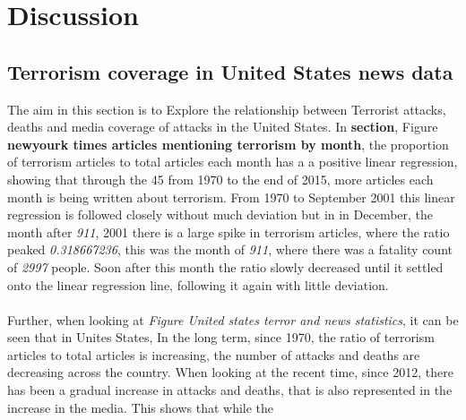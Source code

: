 \documentclass[10pt,a4paper]{article}
\begin{document}
\section{Discussion} 

\subsection{Terrorism coverage in United States news data}
The aim in this section is to Explore the relationship between Terrorist attacks, deaths and media coverage of attacks in the United States. In \textbf{section}, Figure \textbf{newyourk times articles mentioning terrorism by month}, the proportion of terrorism articles to total articles each month has a a positive linear regression, showing that through the 45 from 1970 to the end of 2015, more articles each month is being written about terrorism. From 1970 to September 2001 this linear regression is followed closely without much deviation but in in December, the month after \textit{911}, 2001 there is a large spike in terrorism articles, where the ratio peaked \textit{0.318667236}, this was the month of \textit{911}, where there was a fatality count of \textit{2997} people. Soon after this month the ratio slowly decreased until it settled onto the linear regression line, following it again with little deviation. 
\\\\
Further, when looking at \textit{Figure United states terror and news statistics}, it can be seen that in Unites States, In the long term, since 1970, the ratio of terrorism articles to total articles is increasing, the number of attacks and deaths are decreasing across the country. When looking at the recent time, since 2012, there has been a gradual increase in attacks and deaths, that is also represented in the increase in the media. This shows that while the 
\\\\
\end{document}
